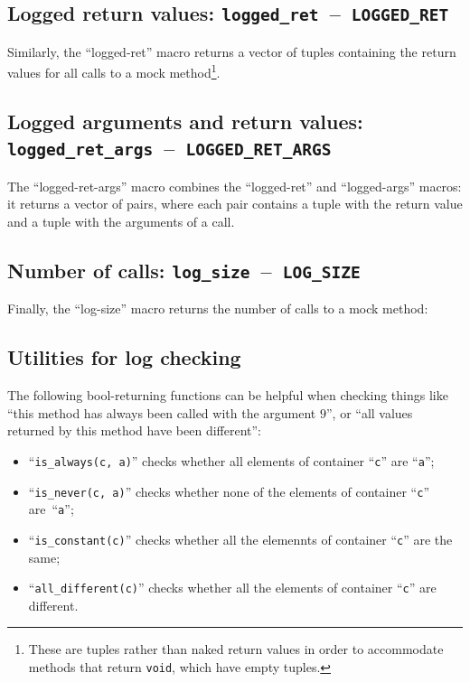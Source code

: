 \documentclass[twoside, a4paper, article]{memoir}
\newcommand*\testudocolor{\color{red!80!blue}}
\newcommand*\testudo[1]{\texttt{\testudocolor{}#1}}
\newcommand*\testudopair[2]{\testudo{#1}~--~\testudo{#2}}
\newcommand\subsectiontestudopair[3]{%
  \subsection[#1]{#1: \testudopair{#2}{#3}}}
\providecommand\typesetexample[1]{%
}
\begin{document}
\subsectiontestudopair{Logged return values}{logged\_ret}{LOGGED\_RET}

Similarly, the ``logged-ret'' macro returns a vector of tuples containing the
return values for all calls to a mock method\footnote{These are tuples rather
  than naked return values in order to accommodate methods that return
  \texttt{void}, which have empty tuples.}.

\typesetexample{check-mock-method-logs-return-values}

\subsectiontestudopair{Logged arguments and return values}%
  {logged\_ret\_args}{LOGGED\_RET\_ARGS}

The ``logged-ret-args'' macro combines the ``logged-ret'' and ``logged-args''
macros: it returns a vector of pairs, where each pair contains a tuple with the
return value and a tuple with the arguments of a call.

\typesetexample{check-mock-method-logs-return-arguments-values}

\subsectiontestudopair{Number of calls}{log\_size}{LOG\_SIZE}
\label{sec:mock-method-number-of-calls}

Finally, the ``log-size'' macro returns the number of calls to a mock method:

\typesetexample{check-mock-method-logs-number-of-calls}


\subsection{Utilities for log checking}
\label{sec:utilities-log-checking}

The following bool-returning functions can be helpful when checking things like
``this method has always been called with the argument $9$'', or ``all values
returned by this method have been different'':
\begin{itemize}
\item ``\texttt{is\_always(c, a)}'' checks whether all elements of container
  ``\texttt{c}'' are ``\texttt{a}'';
\item ``\texttt{is\_never(c, a)}'' checks whether none of the elements of
  container ``\texttt{c}'' are~``\texttt{a}'';
\item ``\texttt{is\_constant(c)}'' checks whether all the elemennts of
  container ``\texttt{c}'' are the same;
\item ``\texttt{all\_different(c)}'' checks whether all the elements of
  container ``\texttt{c}'' are different.
\end{itemize}
\end{document}

